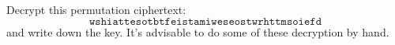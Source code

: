   Decrypt this permutation ciphertext:
  \[
    \texttt{wshiattesotbtfeistamiweseostwrhttmsoiefd}
    \]
    and write down the key.
  It's advisable to do some of these decryption by hand.
